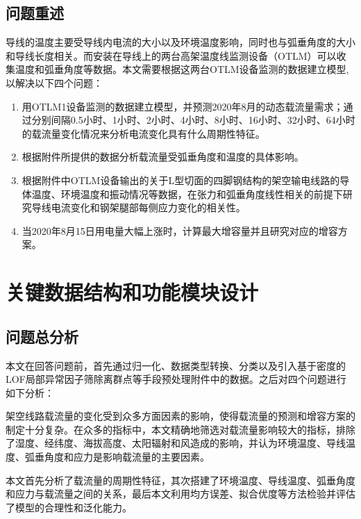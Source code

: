 \documentclass[withoutpreface,bwprint]{cumcmthesis}  %
\begin{document}
	
	
	
	
	\subsection{问题重述}
	导线的温度主要受导线内电流的大小以及环境温度影响，同时也与弧垂角度的大小和导线长度相关。而安装在导线上的两台高架温度线监测设备（OTLM）可以收集温度和弧垂角度等数据。本文需要根据这两台OTLM设备监测的数据建立模型,以解决以下四个问题：
	
	\begin{enumerate}
		\item 用OTLM1设备监测的数据建立模型，并预测2020年8月的动态载流量需求；通过分别间隔0.5小时、1小时、2小时、4小时、8小时、16小时、32小时、64小时的载流量变化情况来分析电流变化具有什么周期性特征。
		
		\item 根据附件所提供的数据分析载流量受弧垂角度和温度的具体影响。
		
		\item 根据附件中OTLM设备输出的关于L型切面的四脚钢结构的架空输电线路的导体温度、环境温度和振动情况等数据，在张力和弧垂角度线性相关的前提下研究导线电流变化和钢架腿部每侧应力变化的相关性。
		
		\item 当2020年8月15日用电量大幅上涨时，计算最大增容量并且研究对应的增容方案。
	\end{enumerate}

	\section{关键数据结构和功能模块设计}
	
	\subsection{问题总分析}
	本文在回答问题前，首先通过归一化、数据类型转换、分类以及引入基于密度的LOF局部异常因子筛除离群点等手段预处理附件中的数据。之后对四个问题进行如下分析：
 
        架空线路载流量的变化受到众多方面因素的影响，使得载流量的预测和增容方案的制定十分复杂。在众多的指标中，本文精确地筛选对载流量影响较大的指标，排除了湿度、经纬度、海拔高度、太阳辐射和风造成的影响，并认为环境温度、导线温度、弧垂角度和应力是影响载流量的主要因素。
        
        本文首先分析了载流量的周期性特征，其次搭建了环境温度、导线温度、弧垂角度和应力与载流量之间的关系，最后本文利用均方误差、拟合优度等方法检验并评估了模型的合理性和泛化能力。
	
\end{document}
